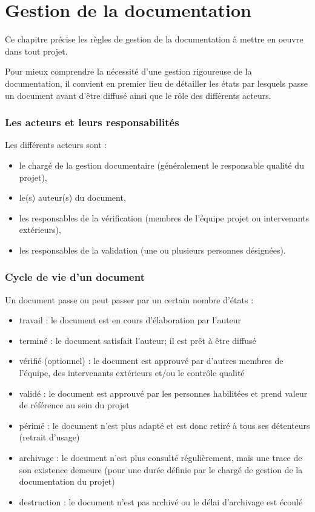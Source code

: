 \documentclass[a4paper]{article}
\begin{document}
\part{Gestion de la documentation}

Ce chapitre précise les règles de gestion de la documentation à mettre en oeuvre dans tout projet.

Pour mieux comprendre la nécessité d’une gestion rigoureuse de la documentation, il convient en premier lieu de détailler les états par lesquels passe un document avant d’être diffusé ainsi que le rôle des différents acteurs.

\section{Les acteurs et leurs responsabilités}

Les différents acteurs sont :

\begin{itemize}
\item le chargé de la gestion documentaire (généralement le responsable qualité du projet),
\item le(s) auteur(s) du document,
\item les responsables de la vérification (membres de l’équipe projet ou intervenants extérieurs),
\item les responsables de la validation (une ou plusieurs personnes désignées).
\end{itemize}


\section{Cycle de vie d'un document}

Un document passe ou peut passer par un certain nombre d'états :

\begin{itemize}
\item travail : le document est en cours d'élaboration par l'auteur
\item terminé : le document satisfait l'auteur; il est prêt à être diffusé
\item vérifié (optionnel) : le document est approuvé par d'autres membres de l'équipe, des intervenants extérieurs et/ou le contrôle qualité
\item validé : le document est approuvé par les personnes habilitées et prend valeur de référence au sein du projet
\item périmé : le document n’est plus adapté et est donc retiré à tous ses détenteurs (retrait d'usage)
\item archivage : le document n'est plus consulté régulièrement, mais une trace de son existence demeure (pour une durée définie par le chargé de gestion de la documentation du projet)
\item destruction : le document n'est pas archivé ou le délai d'archivage est écoulé
\end{itemize}
\end{document}
